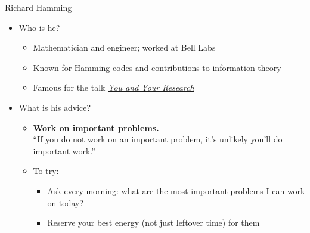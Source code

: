 \documentclass[aspectratio=169]{beamer}
\begin{document}

\begin{frame}{Richard Hamming}
   \begin{itemize}
  \item Who is he?
    \begin{itemize}
    \item Mathematician and engineer; worked at Bell Labs
    \item Known for Hamming codes and contributions to information theory
    \item Famous for the talk \textit{\href{https://www.cs.virginia.edu/~robins/YouAndYourResearch.html}{You and Your Research}} \citep{hamming:you-and-your-research}
  \end{itemize}
\item What is his advice?
  \begin{itemize}
    \item \textbf{Work on important problems.}\\
      ``If you do not work on an important problem, it's unlikely you'll do important work.''\\ \hfill \citep{hamming:you-and-your-research}
    \item To try:
      \begin{itemize}
        \item Ask every morning: what are the most important problems I can work on today?
        \item Reserve your best energy (not just leftover time) for them
      \end{itemize}
  \end{itemize}
\end{itemize}

\end{frame}
\end{document}
